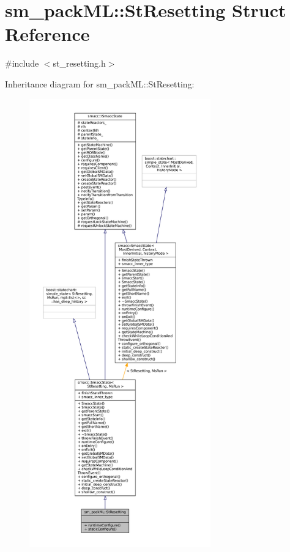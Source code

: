 \hypertarget{structsm__packML_1_1StResetting}{}\section{sm\+\_\+pack\+ML\+:\+:St\+Resetting Struct Reference}
\label{structsm__packML_1_1StResetting}


{\ttfamily \#include $<$st\+\_\+resetting.\+h$>$}



Inheritance diagram for sm\+\_\+pack\+ML\+:\+:St\+Resetting\+:
\nopagebreak
\begin{figure}[H]
\begin{center}
\leavevmode
\includegraphics[height=550pt]{structsm__packML_1_1StResetting__inherit__graph}
\end{center}
\end{figure}


